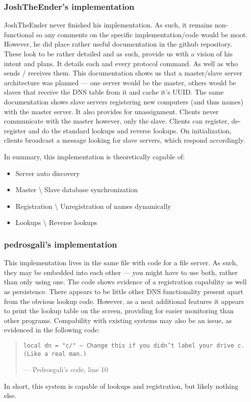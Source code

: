 \documentclass[]{report}
\begin{document}
\subsubsection{JoshTheEnder's implementation}
JoshTheEnder never finished his implementation. As such, it remains non-functional so any comments on the specific implementation/code would be moot. However, he did place rather useful documentation in the github repository. These look to be rather detailed and as such, provide us with a vision of his intent and plans. It details each and every protocol command. As well as who sends / receives them. This documentation shows us that a master/slave server architecture was planned --- one server would be the master, others would be slaves that receive the DNS table from it and cache it's UUID. The same documentation shows slave servers registering new computers (and thus names) with the master server. It also provides for unassignment. Clients never communicate with the master however, only the slave. Clients can register, de-register and do the standard lookups and reverse lookups. On initialization, clients broadcast a message looking for slave servers, which respond accordingly.

In summary, this implementation is theoretically capable of:
\begin{itemize}
	\item Server auto discovery
	\item Master \textbackslash{} Slave database synchronization
	\item Registration \textbackslash{} Unregistration of names dynamically
	\item Lookups \textbackslash{} Reverse lookups
\end{itemize}
\subsubsection{pedrosgali's implementation}
This implementation lives in the same file with code for a file server. As such, they may be embedded into each other --- you might have to use both, rather than only using one. The code shows evidence of a registration capability as well as persistence. There appears to be little other DNS functionality present apart from the obvious lookup code. However, as a neat additional features it appears to print the lookup table on the screen, providing for easier monitoring than other programs. Compability with existing systems may also be an issue, as evidenced in the following code:
\begin{quote}
	\texttt{local dn = "c/" -- Change this if you didn't label your drive c. (Like a real man.)}
	
	--- Pedrosgali's code, line 10
\end{quote}
In short, this system is capable of lookups and registration, but likely nothing else. 
\appendix
\end{document}
